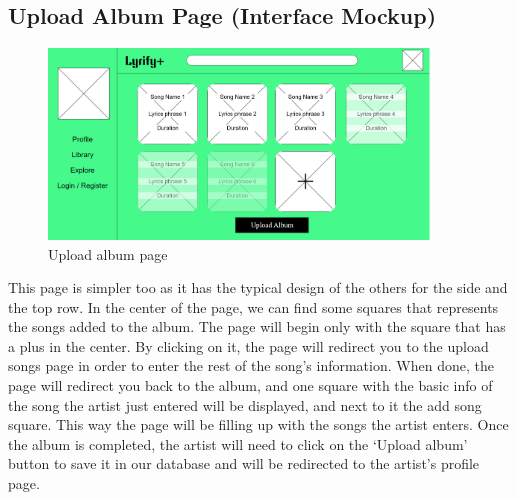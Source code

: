 \subsection{Upload Album Page (Interface Mockup)}

\begin{figure}[h!]
\centering
\includegraphics[width=0.9\textwidth]{sections/PLL/UploadAlbumMockUp.png}
\caption{Upload album page}
\end{figure}

This page is simpler too as it has the typical design of the others for the side and the top row. In the center of the page, we can find some squares that represents the songs added to the album. The page will begin only with the square that has a plus in the center. By clicking on it, the page will redirect you to the upload songs page in order to enter the rest of the song’s information. When done, the page will redirect you back to the album, and one square with the basic info of the song the artist just entered will be displayed, and next to it the add song square. This way the page will be filling up with the songs the artist enters. Once the album is completed, the artist will need to click on the ‘Upload album’ button to save it in our database and will be redirected to the artist’s profile page.